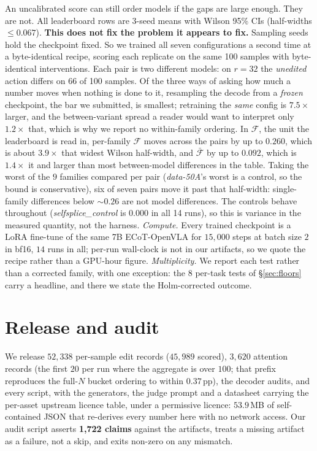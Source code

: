 \documentclass[11pt]{article}
\begin{document}
An uncalibrated score can still order models if the gaps are large enough. They are not. All leaderboard rows are 3-seed means with Wilson 95\% CIs (half-widths $\leq 0.067$). \textbf{This does not fix the problem it appears to fix.} Sampling seeds hold the checkpoint fixed. So we trained all seven configurations a second time at a byte-identical recipe, scoring each replicate on the same 100 samples with byte-identical interventions. Each pair is two different models: on $r{=}32$ the \emph{unedited} action differs on 66 of 100 samples. Of the three ways of asking how much a number moves when nothing is done to it, resampling the decode from a \emph{frozen} checkpoint, the bar we submitted, is smallest; retraining the \emph{same} config is $7.5\times$ larger, and the between-variant spread a reader would want to interpret only $1.2\times$ that, which is why we report no within-family ordering. In $\mathcal{F}$, the unit the leaderboard is read in, per-family $\mathcal{F}$ moves across the pairs by up to $\mathbf{0.260}$, which is about $3.9\times$ that widest Wilson half-width, and $\bar{\mathcal{F}}$ by up to $0.092$, which is $1.4\times$ it and larger than most between-model differences in the table. Taking the worst of the $9$ families compared per pair (\emph{data-50A}'s worst is a control, so the bound is conservative), six of seven pairs move it past that half-width: single-family differences below ${\sim}0.26$ are not model differences. The controls behave throughout (\emph{selfsplice\_control} is $0.000$ in all 14 runs), so this is variance in the measured quantity, not the harness. \emph{Compute.} Every trained checkpoint is a LoRA fine-tune of the same 7B ECoT-OpenVLA \citep{ecot} for $15{,}000$ steps at batch size $2$ in bf16, $14$ runs in all; per-run wall-clock is not in our artifacts, so we quote the recipe rather than a GPU-hour figure. \emph{Multiplicity.} We report each test rather than a corrected family, with one exception: the $8$ per-task tests of \S\ref{sec:floors} carry a headline, and there we state the Holm-corrected outcome.

\section{Release and audit}
\label{sec:release}

We release $52{,}338$ per-sample edit records ($45{,}989$ scored), $3{,}620$ attention records (the first $20$ per run where the aggregate is over $100$; that prefix reproduces the full-$N$ bucket ordering to within $\mathbf{0.37}$\,pp), the decoder audits, and every script, with the generators, the judge prompt and a datasheet \citep{datasheets} carrying the per-asset upstream licence table, under a permissive licence: $53.9$\,MB of self-contained JSON that re-derives every number here with no network access. Our audit script asserts \textbf{1,722 claims} against the artifacts, treats a missing artifact as a failure, not a skip, and exits non-zero on any mismatch.
\end{document}
